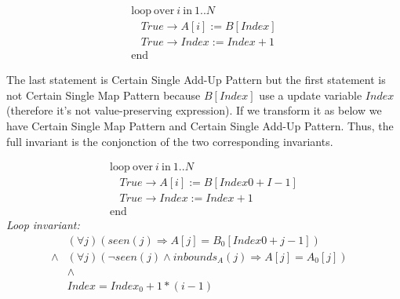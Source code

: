 \documentclass[a4paper,10pt]{article}
\newcommand{\KWloop}{\ensuremath{\mathrm{loop}~}}
\newcommand{\KWend}{\ensuremath{\mathrm{end}~}}
\newcommand{\KWover}{\ensuremath{\mathrm{over}~}}
\newcommand{\KWin}{\ensuremath{~\mathrm{in}~}}
\newcommand{\impl}{\ensuremath{\Longrightarrow}}
\newcommand{\inbounds}[2]{\ensuremath{\mathit{inbounds}_{#1}(#2)}\xspace}
\newcommand{\seen}[1]{\ensuremath{\mathit{seen}(#1)}\xspace}
\newcommand{\loopinvariant}{\noindent\textit{Loop invariant:}\xspace}
\begin{document}
$$\begin{array}{l}
  \KWloop \KWover i \KWin 1 .. N \\
  ~~~~ True \rightarrow A[i] := B[Index]\\
  ~~~~ True \rightarrow Index := Index + 1\\
  \KWend
\end{array}$$

The last statement is Certain Single Add-Up Pattern but the first statement is not Certain Single Map Pattern
because $B[Index]$ use a update variable $Index$ (therefore it's not value-preserving expression). 
If we transform it as below we have Certain Single Map Pattern and Certain Single Add-Up Pattern. 
Thus, the full invariant is the conjonction of the two corresponding invariants.

$$\begin{array}{l}
  \KWloop \KWover i \KWin 1 .. N \\
  ~~~~ True \rightarrow A[i]   := B[Index0 + I-1]\\
  ~~~~ True \rightarrow Index := Index + 1\\
  \KWend
\end{array}$$
%
\loopinvariant
%
\begin{eqnarray*}
&(\forall j)(\seen{j} \impl A[j] = B_0[Index0 + j-1]) \\
\land& (\forall j)(\neg \seen{j} \land \inbounds{A}{j} \impl A[j] = A_0[j])\\
&\land& \\
&Index = Index_0 + 1 * (i-1)&
\end{eqnarray*}



\end{document}
